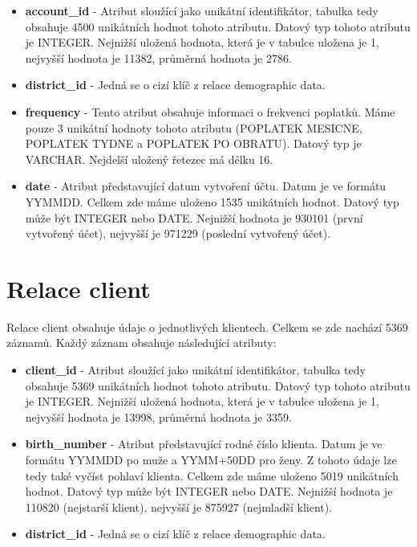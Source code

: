 \documentclass{article}
\begin{document}
\begin{itemize}
				
	\item \textbf{account\_id} - Atribut sloužící jako unikátní identifikátor, tabulka tedy obsahuje 4500 unikátních hodnot tohoto atributu. Datový typ tohoto atributu je INTEGER. Nejnižší uložená hodnota, která je v tabulce uložena je 1, nejvyšší hodnota je 11382, průměrná hodnota je 2786. 
	
	\item \textbf{district\_id} - Jedná se o cizí klíč z relace demographic data.
	
	\item \textbf{frequency} - Tento atribut obsahuje informaci o frekvenci poplatků. Máme pouze 3 unikátní hodnoty tohoto atributu (POPLATEK MESICNE, POPLATEK TYDNE a POPLATEK PO OBRATU). Datový typ je VARCHAR. Nejdelší uložený řetezec má délku 16.
	
	\item \textbf{date} - Atribut představující datum vytvoření účtu. Datum je ve formátu YYMMDD. Celkem zde máme uloženo 1535 unikátních hodnot. Datový typ může být INTEGER nebo DATE. Nejnižší hodnota je 930101 (první vytvořený účet), nejvyšší je 971229 (poslední vytvořený účet). 
					
				
\end{itemize}

\section{Relace client}

Relace client obsahuje údaje o jednotlivých klientech. Celkem se zde nachází 5369 záznamů. Každý záznam obsahuje následující atributy:


\begin{itemize}
				
	\item \textbf{client\_id} - Atribut sloužící jako unikátní identifikátor, tabulka tedy obsahuje 5369 unikátních hodnot tohoto atributu. Datový typ tohoto atributu je INTEGER. Nejnižší uložená hodnota, která je v tabulce uložena je 1, nejvyšší hodnota je 13998, průměrná hodnota je 3359. 
	
	\item \textbf{birth\_number} - Atribut představující rodné číslo klienta. Datum je ve formátu YYMMDD po muže a YYMM+50DD pro ženy. Z tohoto údaje lze tedy také vyčíst pohlaví klienta. Celkem zde máme uloženo 5019 unikátních hodnot. Datový typ může být INTEGER nebo DATE. Nejnižší hodnota je 110820 (nejstarší klient), nejvyšší je 875927 (nejmladší klient). 
	
	\item \textbf{district\_id} -  Jedná se o cizí klíč z relace demographic data.
					
				
\end{itemize}
\end{document}

